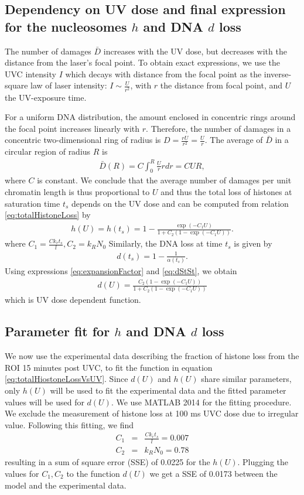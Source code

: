 \documentclass[12pt]{article}
\newcommand{\beq}{\begin{eqnarray}}
\newcommand{\eeq}{\end{eqnarray}}
\begin{document}
\subsection{Dependency on UV dose and final expression for the nucleosomes $h$ and DNA $d$ loss}
The number of damages $\bar{D}$ increases with the UV dose, but decreases with the distance from the laser's focal point. To obtain exact expressions, we use the UVC intensity $I$ which decays with distance from the focal point as the inverse-square law of laser intensity: $I \sim \frac{U}{r^2}$, with $r$ the distance from focal point, and $U$ the UV-exposure time.

For a uniform DNA distribution, the amount enclosed in concentric rings around the focal point increases linearly with $r$. Therefore, the number of damages in a concentric two-dimensional ring of radius is ${D}= \frac{rU}{r^2}=\frac{U}{r}$. The average of $\bar{D}$ in a circular region of radius $R$ is
\beq
\bar{D}(R) = C\int_0^R \frac{U}{r} rdr = CUR,
\eeq
where $C$ is constant. We conclude that the average number of damages per unit chromatin length is thus proportional to $U$ and thus the total loss of histones at saturation time $t_{s}$ depends on the UV dose and can be computed from relation \ref{eq:totalHistoneLoss} by
\beq\label{eq:totalHiostoneLossVsUV}
h(U)=h(t_s)=1-\frac{\exp(-C_1 U)}{ 1+C_2(1-\exp(-C_1 U))}.
\eeq
where $C_1=\frac{Ck_rt_s}{l}, C_2=k_RN_0$
Similarly, the DNA loss at time $t_{s}$ is given by 
\beq\label{eq:dStSt}
d(t_s)= 1-\frac1{\alpha(t_s)}. 
\eeq
Using expressions \ref{eq:expansionFactor} and \ref{eq:dStSt}, we obtain
\beq\label{eq:dnaLoss}
d(U)= \frac{C_2(1-\exp(-C_1 U))}{1+C_2(1-\exp(-C_1 U))}
\eeq
which is UV dose dependent function. 


\subsection{Parameter fit for $h$ and DNA $d$ loss}\label{subsection:parameterFit}
We now use the experimental data describing the fraction of histone loss from the ROI 15 minutes post UVC, to fit the function in equation \ref{eq:totalHiostoneLossVsUV}. Since $d(U)$ and $h(U)$ share similar parameters, only $h(U)$ will be used to fit the experimental data and the fitted parameter values will be used for $d(U)$. We use MATLAB 2014 for the fitting procedure. We exclude the measurement of histone loss at 100 ms UVC dose due to irregular value. Following this fitting, we find
\beq
C_1 &=& \frac{Ck_rt_s}{l} = 0.007\\
C_2 &=& k_RN_0 = 0.78
\eeq
resulting in a sum of square error (SSE) of 0.0225 for the $h(U)$. Plugging the values for $C_1,C_2$ to the function $d(U)$ we get a SSE of 0.0173 between the model and the experimental data. 
\end{document}
